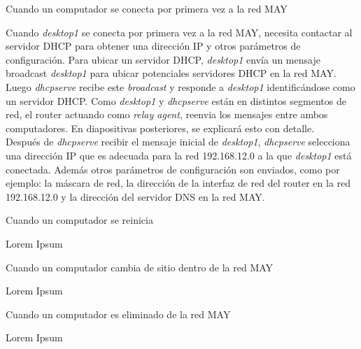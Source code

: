 \begin{frame}{Cuando un computador se conecta por primera vez a la red
MAY} %

    Cuando \textit{desktop1} se conecta por primera vez a la red MAY, necesita
    contactar al servidor DHCP para obtener una dirección IP y otros parámetros
    de configuración. Para ubicar un servidor DHCP, \textit{desktop1} envía un
    mensaje broadcast \textit{desktop1} para ubicar potenciales servidores
    DHCP en la red MAY.\\[0.2cm]

    Luego \textit{dhcpserve} recibe este \textit{broadcast} y responde a
    \textit{desktop1} identificándose como un servidor DHCP. Como
    \textit{desktop1} y \textit{dhcpserve} están en distintos segmentos de red,
    el router actuando como \textit{relay agent}, reenvia los mensajes entre
    ambos computadores. En diapositivas posteriores, se explicará esto con
    detalle.\\[0.2cm]

    Después de \textit{dhcpserve} recibir el mensaje inicial de
    \textit{desktop1}, \textit{dhcpserve} selecciona una dirección IP que es
    adecuada para la red 192.168.12.0 a la que \textit{desktop1} está
    conectada. Además otros parámetros de configuración son enviados, como por
    ejemplo: la máscara de red, la dirección de la interfaz de red del router
    en la red 192.168.12.0 y la dirección del servidor DNS en la red
    MAY.\\[0.2cm]

\end{frame}


\begin{frame}[fragile]{Cuando un computador se reinicia} 

    Lorem Ipsum

\end{frame}


\begin{frame}[fragile]{Cuando un computador cambia de sitio dentro de
la red MAY} 

    Lorem Ipsum

\end{frame}


\begin{frame}[fragile]{Cuando un computador es eliminado de la red MAY}

    Lorem Ipsum

\end{frame}


